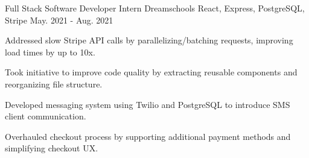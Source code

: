 \begin{cventries}
  \cventry
    {Full Stack Software Developer Intern} %
    {Dreamschools} %
    {React, Express, PostgreSQL, Stripe} %
    {May. 2021 - Aug. 2021} %
    {
      \begin{cvitems} %
        \item {Addressed slow Stripe API calls by parallelizing/batching requests, improving load times by up to 10x.}
        \item {Took initiative to improve code quality by extracting reusable components and reorganizing file structure.}
        \item {Developed messaging system using Twilio and PostgreSQL to introduce SMS client communication.}
        \item {Overhauled checkout process by supporting additional payment methods and simplifying checkout UX.}
      \end{cvitems}
    }
\end{cventries}
